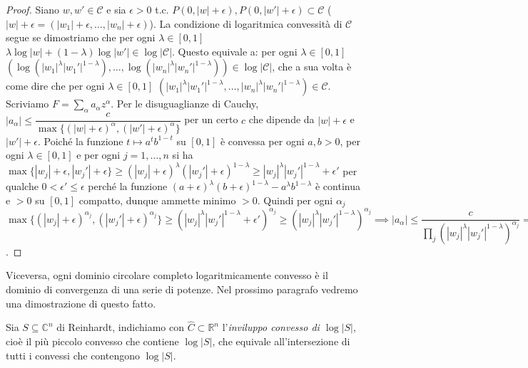 \begin{proof}
  Siano $w, w' \in \mathcal{C}$ e sia $\epsilon>0$ t.c. $P(0, |w|+\epsilon), P(0, |w'|+\epsilon) \subset \mathcal{C}$ ($|w|+\epsilon=(|w_1|+\epsilon, \dots, |w_n|+\epsilon)$). La condizione di logaritmica convessità di $\mathcal{C}$ segue se dimostriamo che per ogni $\lambda \in [0,1]$ $\lambda\log{|w|}+(1-\lambda)\log{|w'|} \in \log{|\mathcal{C}|}$.
  Questo equivale a: per ogni $\lambda \in [0,1]$ $(\log{(|w_1|^{\lambda}|w_1'|^{1-\lambda})},\dots,\log{(|w_n|^{\lambda}|w_n'|^{1-\lambda})}) \in \log{|\mathcal{C}|}$, che a sua volta è come dire che per ogni $\lambda \in [0,1]$ $(|w_1|^{\lambda}|w_1'|^{1-\lambda},\dots,|w_n|^{\lambda}|w_n'|^{1-\lambda}) \in \mathcal{C}$.
  Scriviamo $\displaystyle F=\sum_{\alpha} a_{\alpha}z^{\alpha}$. Per le disuguaglianze di Cauchy, $|a_{\alpha}| \le \dfrac{c}{\max\{(|w|+\epsilon)^{\alpha},(|w'|+\epsilon)^{\alpha}\}}$ per un certo $c$ che dipende da $|w|+\epsilon$ e $|w'|+\epsilon$.
  Poiché la funzione $t \longmapsto a^tb^{1-t}$ su $[0,1]$ è convessa per ogni $a, b>0$, per ogni $\lambda \in [0,1]$ e per ogni $j=1,\dots,n$ si ha $\max\{|w_j|+\epsilon, |w_j'|+\epsilon\} \ge (|w_j|+\epsilon)^{\lambda}(|w_j'|+\epsilon)^{1-\lambda} \ge |w_j|^{\lambda}|w_j'|^{1-\lambda}+\epsilon'$ per qualche $0<\epsilon'\le\epsilon$ perché la funzione $(a+\epsilon)^{\lambda}(b+\epsilon)^{1-\lambda}-a^{\lambda}b^{1-\lambda}$ è continua e $>0$ su $[0,1]$ compatto, dunque ammette minimo $>0$.
  Quindi per ogni $\alpha_j$ $\max\{(|w_j|+\epsilon)^{\alpha_j},(|w_j'|+\epsilon)^{\alpha_j}\} \ge (|w_j|^{\lambda}|w_j'|^{1-\lambda}+\epsilon')^{\alpha_j} \ge (|w_j|^{\lambda}|w_j'|^{1-\lambda})^{\alpha_j} \implies |a_{\alpha}| \le \dfrac{c}{\prod_j (|w_j|^{\lambda}|w_j'|^{1-\lambda})^{\alpha_j}} \implies (|w_1|^{\lambda}|w_1'|^{1-\lambda}, \dots, |w_n|^{\lambda}|w_n'|^{1-\lambda}) \in \mathcal{C}$.
\end{proof}

\begin{ftt}
  Viceversa, ogni dominio circolare completo logaritmicamente convesso è il dominio di convergenza di una serie di potenze. Nel prossimo paragrafo vedremo una dimostrazione di questo fatto.
\end{ftt}

\begin{defn}
  Sia $S \subseteq \mathbb{C}^n$ di Reinhardt, indichiamo con $\hat{C} \subset \mathbb{R}^n$ l'\textit{inviluppo convesso di $\log{|S|}$}, cioè il più piccolo convesso che contiene $\log{|S|}$, che equivale all'intersezione di tutti i convessi che contengono $\log{|S|}$.
\end{defn}

